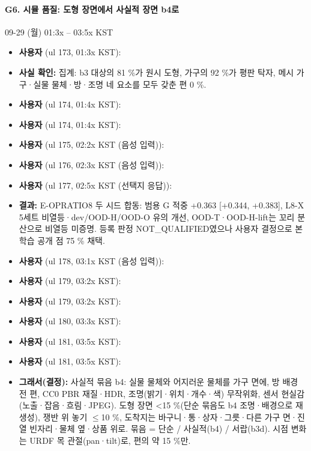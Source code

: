 \paragraph{G6. 시뮬 품질: 도형 장면에서 사실적 장면 b4로}
{\small 09-29 (월) 01:3x -- 03:5x KST}
\begin{itemize}
  \item \textbf{사용자} (ul 173, 01:3x KST): 
  \item \textbf{사실 확인:} 집계: b3 대상의 81 \%가 원시 도형, 가구의 92 \%가 평판 탁자, 메시 가구·실물 물체·방·조명 네 요소를 모두 갖춘 편 0 \%.
  \item \textbf{사용자} (ul 174, 01:4x KST): 
  \item \textbf{사용자} (ul 174, 01:4x KST): 
  \item \textbf{사용자} (ul 175, 02:2x KST (음성 입력)): 
  \item \textbf{사용자} (ul 176, 02:3x KST (음성 입력)): 
  \item \textbf{사용자} (ul 177, 02:5x KST (선택지 응답)): 
  \item \textbf{결과:} E-OPRATIO8 두 시드 합동: 범용 G 적중 +0.363 [+0.344, +0.383], L8-X 5세트 비열등·dev/OOD-H/OOD-O 유의 개선, OOD-T·OOD-H-lift는 꼬리 분산으로 비열등 미증명. 등록 판정 NOT\_QUALIFIED였으나 사용자 결정으로 본 학습 공개 점 75 \% 채택.
  \item \textbf{사용자} (ul 178, 03:1x KST (음성 입력)): 
  \item \textbf{사용자} (ul 179, 03:2x KST): 
  \item \textbf{사용자} (ul 179, 03:2x KST): 
  \item \textbf{사용자} (ul 180, 03:3x KST): 
  \item \textbf{사용자} (ul 181, 03:5x KST): 
  \item \textbf{사용자} (ul 181, 03:5x KST): 
  \item \textbf{그래서(결정):} 사실적 묶음 b4: 실물 물체와 어지러운 물체를 가구 면에, 방 배경 전 편, CC0 PBR 재질·HDR, 조명(밝기·위치·개수·색) 무작위화, 센서 현실감(노출·잡음·흐림·JPEG). 도형 장면 <15 \%(단순 묶음도 b4 조명·배경으로 재생성), 쟁반 위 놓기 $\leq$10 \%, 도착지는 바구니·통·상자·그릇·다른 가구 면·진열 빈자리·물체 옆·상품 위로. 묶음 = 단순 / 사실적(b4) / 서랍(b3d). 시점 변화는 URDF 목 관절(pan·tilt)로, 편의 약 15 \%만.
\end{itemize}

